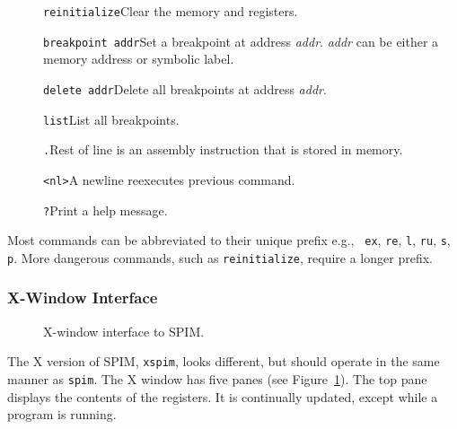 \documentclass[11pt]{article}
\begin{document}
\begin{description}
  \item [] {\tt reinitialize}\newline Clear the memory and registers.

  \item [] {\tt breakpoint addr}\newline Set a breakpoint at address
{\em addr\/}.  {\em addr\/} can be either a memory address or symbolic
label.

  \item [] {\tt delete addr}\newline Delete all breakpoints at address
{\em addr\/}.

  \item [] {\tt list}\newline List all breakpoints.

  \item [] {\tt .}\newline Rest of line is an assembly instruction
that is stored in memory.

  \item [] {\tt <nl>}\newline A newline reexecutes previous command.

  \item [] {\tt ?}\newline Print a help message.
\end{description}

Most commands can be abbreviated to their unique prefix e.g., {\tt
ex}, {\tt re}, {\tt l}, {\tt ru}, {\tt s}, {\tt p}.  More dangerous
commands, such as {\tt reinitialize}, require a longer prefix.

\subsubsection{X-Window Interface}

\begin{figure}
  \centerline{}
  \caption{X-window interface to SPIM.}
  \label{fig:xinterface}
\end{figure}
The X version of SPIM, {\tt xspim}, looks different, but should
operate in the same manner as {\tt spim}.  The X window has five panes
(see Figure~\ref{fig:xinterface}).  The top pane displays the contents
of the registers.  It is continually updated, except while a program
is running.
\end{document}
